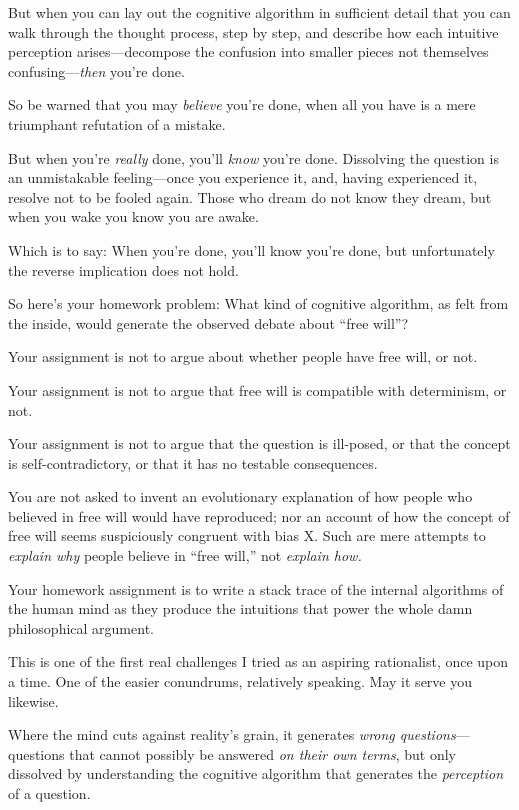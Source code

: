 {
 But when you can lay out the cognitive algorithm in sufficient
detail that you can walk through the thought process, step by step, and
describe how each intuitive perception arises---decompose the confusion
into smaller pieces not themselves confusing---\textit{then}
you're done.}

{
 So be warned that you may \textit{believe} you're
done, when all you have is a mere triumphant refutation of a mistake.}

{
 But when you're \textit{really} done,
you'll \textit{know} you're done.
Dissolving the question is an unmistakable feeling---once you
experience it, and, having experienced it, resolve not to be fooled
again. Those who dream do not know they dream, but when you wake you
know you are awake.}

{
 Which is to say: When you're done,
you'll know you're done, but
unfortunately the reverse implication does not hold.}

{
 So here's your homework problem: What kind of
cognitive algorithm, as felt from the inside, would generate the
observed debate about ``free
will''?}

{
 Your assignment is not to argue about whether people have free
will, or not.}

{
 Your assignment is not to argue that free will is compatible with
determinism, or not.}

{
 Your assignment is not to argue that the question is ill-posed, or
that the concept is self-contradictory, or that it has no testable
consequences.}

{
 You are not asked to invent an evolutionary explanation of how
people who believed in free will would have reproduced; nor an account
of how the concept of free will seems suspiciously congruent with bias
X. Such are mere attempts to \textit{explain why} people believe in
``free will,'' not \textit{explain
how.}}

{
 Your homework assignment is to write a stack trace of the internal
algorithms of the human mind as they produce the intuitions that power
the whole damn philosophical argument.}

{
 This is one of the first real challenges I tried as an aspiring
rationalist, once upon a time. One of the easier conundrums, relatively
speaking. May it serve you likewise.}

\myendsectiontext



{
 Where the mind cuts against reality's grain, it
generates \textit{wrong questions}{}---questions that cannot possibly
be answered \textit{on their own terms}, but only dissolved by
understanding the cognitive algorithm that generates the
\textit{perception} of a question. }

